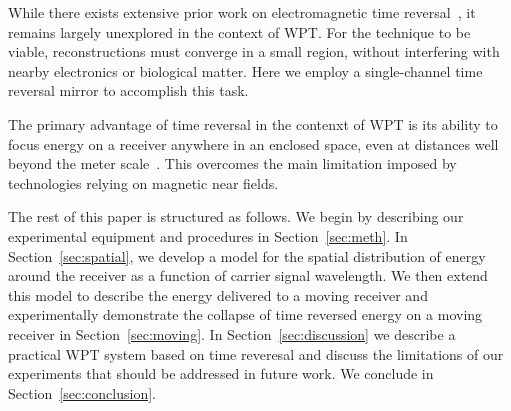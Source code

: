 While there exists extensive prior work on electromagnetic time
reversal~\cite{fink,nltr-wave-chaotic,nltr-classical-waves,tr-green}, it remains
largely unexplored in the context of WPT\@.
%
For the technique to be viable, reconstructions must converge in a small region,
without interfering with nearby electronics or biological matter.
%
Here we employ a single-channel time reversal mirror to
accomplish this task.


The primary advantage of time reversal in the contenxt of WPT is its ability
to focus energy on a receiver anywhere in an enclosed space, even at distances
well beyond the meter scale~\cite{fink,nltr-wave-chaotic}.
%
This overcomes the main limitation imposed by technologies relying
on magnetic near fields.


The rest of this paper is structured as follows.
%
We begin by describing our experimental equipment and procedures in
Section~\ref{sec:meth}.
%
In Section~\ref{sec:spatial}, we develop a model for the spatial distribution
of energy around the receiver as a
function of carrier signal wavelength.
%
We then extend this model to describe the energy delivered to a moving receiver
and experimentally demonstrate the collapse of time reversed energy on a moving
receiver in Section~\ref{sec:moving}.
%
In Section~\ref{sec:discussion} we describe a practical WPT system based on
time reveresal and discuss the limitations of our experiments that should be
addressed in future work.
%
We conclude in Section~\ref{sec:conclusion}.
